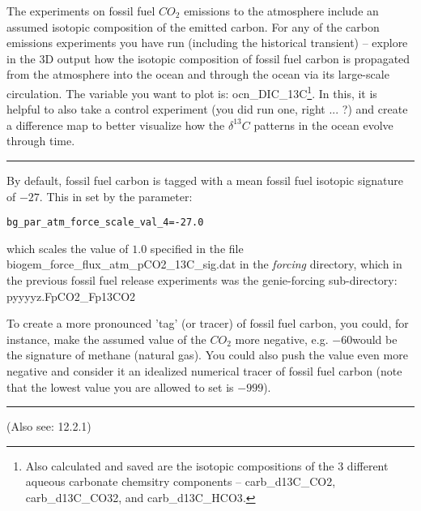 \noindent The  experiments on fossil fuel \(CO_{2}\) emissions to the atmosphere include an assumed isotopic composition of the emitted carbon. For any of the carbon emissions experiments you have run (including the historical transient) -- explore in the 3D output how the  isotopic composition of fossil fuel carbon is propagated from the atmosphere into the ocean and  through the ocean via its large-scale circulation. The variable you want to plot is: \textsf{\footnotesize ocn\_DIC\_13C}\footnote{Also calculated and saved are the isotopic compositions of the 3 different aqueous carbonate chemsitry components -- \textsf{\footnotesize carb\_d13C\_CO2}, \textsf{\footnotesize carb\_d13C\_CO32}, and \textsf{\footnotesize carb\_d13C\_HCO3}.}. In this, it is helpful to also take a control experiment (you did run one, right ... ?) and create a difference map to better visualize how the \(\delta^{13}C\) patterns in the ocean evolve through time.

\vspace{1mm}
\noindent\rule{4cm}{0.1mm}
\vspace{2mm}

\noindent By default, fossil fuel carbon is tagged with a mean fossil fuel isotopic signature of \(-27\)\permille. This in set by the parameter:
\vspace{-1mm}\small\begin{verbatim}
bg_par_atm_force_scale_val_4=-27.0
\end{verbatim}\normalsize\vspace{-1mm}
which scales the value of \(1.0\) specified in the file \textsf{\footnotesize biogem\_force\_flux\_atm\_pCO2\_13C\_sig.dat} in the \textit{forcing} directory, which in the previous fossil fuel release experiments was the \textsf{\footnotesize genie-forcing} sub-directory:
\vspace{2pt}
\\\noindent \footnotesize\textsf{pyyyyz.FpCO2\_Fp13CO2}\normalsize
\vspace{2pt}

\vspace{1mm}

To create a more pronounced 'tag' (or tracer) of fossil fuel carbon, you could, for instance, make the assumed value of the \(CO_{2}\) more negative, e.g. \(-60\)\permille would be the signature of methane (natural gas). You could also push the value even more negative and consider it an idealized numerical tracer of fossil fuel carbon (note that the lowest value you are allowed to set is \(-999\)\permille).

\vspace{1mm}
\noindent\rule{4cm}{0.1mm}
\vspace{2mm}

\noindent (Also see: 12.2.1)

